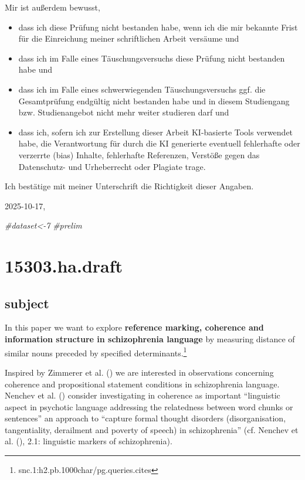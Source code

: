 \documentclass[
  12pt,
  oneside]{book}
\newenvironment{Shaded}{\begin{snugshade}}{\end{snugshade}}
\newcommand{\CommentTok}[1]{\textcolor[rgb]{0.56,0.35,0.01}{\textit{#1}}}
\providecommand{\tightlist}{%
  \setlength{\itemsep}{0pt}\setlength{\parskip}{0pt}}
\begin{document}
Mir ist außerdem bewusst,

\begin{itemize}
\tightlist
\item
  dass ich diese Prüfung nicht bestanden habe, wenn ich die mir bekannte Frist für die Einreichung meiner schriftlichen Arbeit versäume und
\item
  dass ich im Falle eines Täuschungsversuchs diese Prüfung nicht bestanden habe und
\item
  dass ich im Falle eines schwerwiegenden Täuschungsversuchs ggf. die Gesamtprüfung endgültig nicht bestanden habe und in diesem Studiengang bzw. Studienangebot nicht mehr weiter studieren darf und
\item
  dass ich, sofern ich zur Erstellung dieser Arbeit KI-basierte Tools verwendet habe, die Verantwortung für durch die KI generierte eventuell fehlerhafte oder verzerrte (bias) Inhalte, fehlerhafte Referenzen, Verstöße gegen das Datenschutz- und Urheberrecht oder Plagiate trage.
\end{itemize}

Ich bestätige mit meiner Unterschrift die Richtigkeit dieser Angaben.

2025-10-17,

\clearpage

\begin{Shaded}
\begin{Highlighting}[]
\CommentTok{\#dataset\textless{}{-}7}
\CommentTok{\#prelim}
\end{Highlighting}
\end{Shaded}

\chapter{15303.ha.draft}\label{ha.draft}

\section{subject}\label{subject}

In this paper we want to explore \textbf{reference marking, coherence and information structure in schizophrenia language} by measuring distance of similar nouns preceded by specified determinants.\footnote{snc.1:h2.pb.1000char/pg.queries.cites}

Inspired by Zimmerer et al. () we are interested in observations concerning coherence and propositional statement conditions in schizophrenia language. Nenchev et al. () consider investigating in coherence as important ``linguistic aspect in psychotic language addressing the relatedness between word chunks or sentences'' an approach to ``capture formal thought disorders (disorganisation, tangentiality, derailment and poverty of speech) in schizophrenia'' (cf. Nenchev et al. (), 2.1: linguistic markers of schizophrenia).
\end{document}
